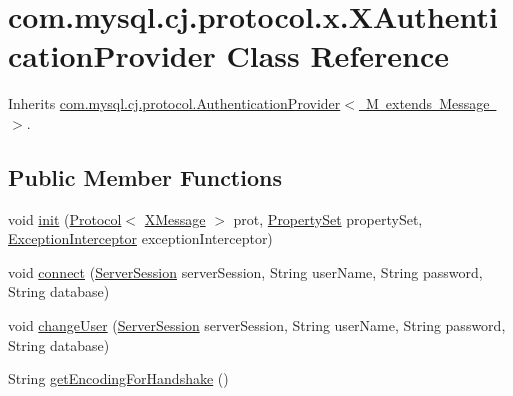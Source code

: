 \hypertarget{classcom_1_1mysql_1_1cj_1_1protocol_1_1x_1_1_x_authentication_provider}{}\section{com.\+mysql.\+cj.\+protocol.\+x.\+X\+Authentication\+Provider Class Reference}
\label{classcom_1_1mysql_1_1cj_1_1protocol_1_1x_1_1_x_authentication_provider}


Inherits \mbox{\hyperlink{interfacecom_1_1mysql_1_1cj_1_1protocol_1_1_authentication_provider}{com.\+mysql.\+cj.\+protocol.\+Authentication\+Provider$<$ M extends Message $>$}}.

\subsection*{Public Member Functions}
\begin{DoxyCompactItemize}
\item 
void \mbox{\hyperlink{classcom_1_1mysql_1_1cj_1_1protocol_1_1x_1_1_x_authentication_provider_a628e0d6b6faff2dec99b4ddb9f7cbb58}{init}} (\mbox{\hyperlink{interfacecom_1_1mysql_1_1cj_1_1protocol_1_1_protocol}{Protocol}}$<$ \mbox{\hyperlink{classcom_1_1mysql_1_1cj_1_1protocol_1_1x_1_1_x_message}{X\+Message}} $>$ prot, \mbox{\hyperlink{interfacecom_1_1mysql_1_1cj_1_1conf_1_1_property_set}{Property\+Set}} property\+Set, \mbox{\hyperlink{interfacecom_1_1mysql_1_1cj_1_1exceptions_1_1_exception_interceptor}{Exception\+Interceptor}} exception\+Interceptor)
\item 
void \mbox{\hyperlink{classcom_1_1mysql_1_1cj_1_1protocol_1_1x_1_1_x_authentication_provider_a1454c94a9b23f6302cc37a2efa714b9d}{connect}} (\mbox{\hyperlink{interfacecom_1_1mysql_1_1cj_1_1protocol_1_1_server_session}{Server\+Session}} server\+Session, String user\+Name, String password, String database)
\item 
void \mbox{\hyperlink{classcom_1_1mysql_1_1cj_1_1protocol_1_1x_1_1_x_authentication_provider_afd444d5b0926e61a8b14b6300aa739cc}{change\+User}} (\mbox{\hyperlink{interfacecom_1_1mysql_1_1cj_1_1protocol_1_1_server_session}{Server\+Session}} server\+Session, String user\+Name, String password, String database)
\item 
String \mbox{\hyperlink{classcom_1_1mysql_1_1cj_1_1protocol_1_1x_1_1_x_authentication_provider_adf03df5479398541ea3039c50956db0f}{get\+Encoding\+For\+Handshake}} ()
\end{DoxyCompactItemize}

